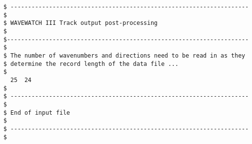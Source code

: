 \begin{footnotesize}
\begin{verbatim}
$ -------------------------------------------------------------------- $
$ WAVEWATCH III Track output post-processing                           $
$--------------------------------------------------------------------- $
$ The number of wavenumbers and directions need to be read in as they
$ determine the record length of the data file ...
$
  25  24
$
$ -------------------------------------------------------------------- $
$ End of input file                                                    $
$ -------------------------------------------------------------------- $
\end{verbatim}
\end{footnotesize}
